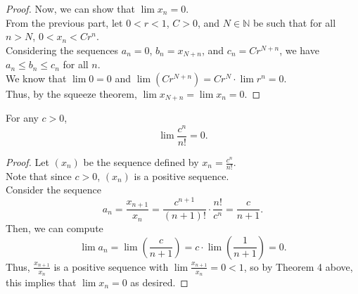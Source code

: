 \documentclass{article}
\newenvironment{theorem}[1]{\renewcommand\theinnercustomthm{#1}\innercustomthm}
  {\endinnercustomthm}
\begin{document}
\begin{proof}
    Now, we can show that $\lim x_n = 0$. \\
    From the previous part, let $0 < r<1$, $C>0$, and $N \in \mathbb N$ be such that for all $n > N$, $0 < x_n < C r^n$. \\
    Considering the sequences $a_n = 0$, $b_n = x_{N+n}$, and $c_n = C r^{N+n}$, we have $a_n \le b_n \le c_n$ for all $n$. \\
    We know that $\lim 0 = 0$ and $\lim \left(C r^{N+n}\right) = C r^N \cdot \lim r^n = 0$. \\
    Thus, by the squeeze theorem, $\lim x_{N+n} = \lim x_n = 0$.
\end{proof}

\begin{theorem}{5}
    For any $c > 0$,
    \[
    \lim \frac{c^n}{n!} = 0.
    \]
\end{theorem}
\begin{proof}
    Let $(x_n)$ be the sequence defined by $x_n = \frac{c^n}{n!}$. \\
    Note that since $c>0$, $(x_n)$ is a positive sequence. \\
    Consider the sequence \[a_n = \frac{x_{n+1}}{x_n} = \frac{c^{n+1}}{(n+1)!}\cdot \frac{n!}{c^n} = \frac{c}{n+1}.\]
    Then, we can compute
    \[
    \lim a_n = \lim \left(\frac{c}{n+1}\right) = c \cdot \lim \left(\frac{1}{n+1}\right) = 0.
    \]
    Thus, $\frac{x_{n+1}}{x_n}$ is a positive sequence with $\lim \frac{x_{n+1}}{x_n} = 0 < 1$, so
    by Theorem 4 above, this implies that $\lim x_n = 0$ as desired.
\end{proof}
\end{document}
